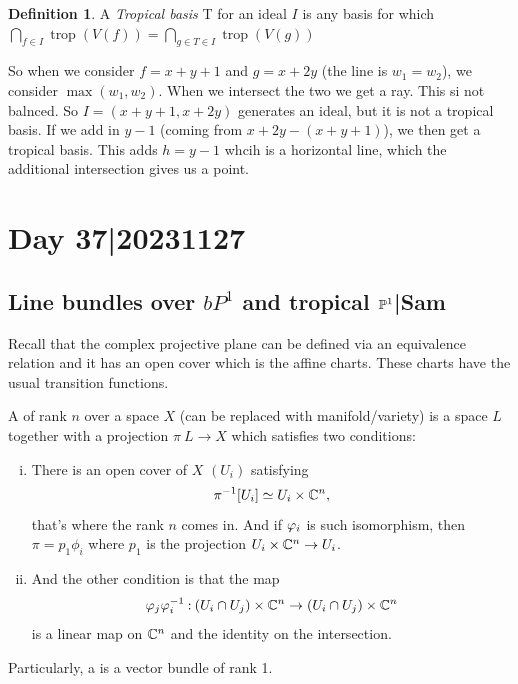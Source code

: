 \documentclass[12pt]{memoir}
\theoremstyle{definition}
\newtheorem{protodefinition}{Definition}[section]
\newenvironment{define}
   {\begin{protodefinition}}
   {\end{protodefinition}}
\DeclareMathOperator{\trop}{trop}
\begin{document}
\begin{define}
    A \emph{Tropical basis} T for an ideal $I$ is any basis for which $\bigcap\limits_{f \in I} \trop(V(f)) = \bigcap\limits_{g \in T \in I} \trop(V(g))$
\end{define}



So when we consider $f=x+y+1$ and $ g= x+2y$ (the line is $w_1=w_2$), we consider $\max(w_1,w_2)$. When we intersect the two we get a ray. This si not balnced. So $I=(x+y+1,x+2y)$ generates an ideal, but it is not a tropical basis. If we add in $y-1$ (coming from $x+2y-(x+y+1)$), we then get a tropical basis. This adds $h=y-1$ whcih is a horizontal line, which the additional intersection gives us a point.




\section{Day 37|20231127}

\subsection{Line bundles over $bP^1$ and tropical $\mathbb{P}^1$|Sam}

Recall that the complex projective plane can be defined via an equivalence relation and it has an open cover which is the affine charts. These charts have the usual transition functions. 

\begin{Def}
    A  of rank $n$ over a space $X$ (can be replaced with manifold/variety) is a space $L$ together with a projection $\pi\: L\to X$ which satisfies two conditions:
    \begin{enumerate}[i)]
        \item There is an open cover of $X$ $(U_i)$ satisfying 
        $$\pi^{-1}[U_i]\simeq U_i\times\mathbb{C}^n,$$
        that's where the rank $n$ comes in. And if $\varphi_i$ is such isomorphism, then $\pi=p_1\phi_i$ where $p_1$ is the projection $U_i\times\mathbb{C}^n\to U_i$.
        \item And the other condition is that the map 
        $$\varphi_j\varphi_i^{-1}\mathbin{:} (U_i\cap U_j)\times\mathbb{C}^n\to(U_i\cap U_j)\times\mathbb{C}^n$$
        is a linear map on $\mathbb{C}^n$ and the identity on the intersection.
    \end{enumerate}
    Particularly, a  is a vector bundle of rank 1.
\end{Def}
\end{document}
